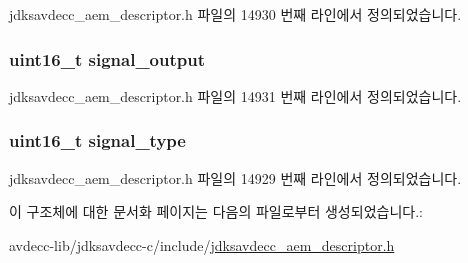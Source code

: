 jdksavdecc\+\_\+aem\+\_\+descriptor.\+h 파일의 14930 번째 라인에서 정의되었습니다.

\subsubsection[{\texorpdfstring{signal\+\_\+output}{signal_output}}]{\setlength{\rightskip}{0pt plus 5cm}uint16\+\_\+t signal\+\_\+output}\hypertarget{structjdksavdecc__descriptor__external__port_ab4b91864e6fc335d7e86536d9f4461e4}{}\label{structjdksavdecc__descriptor__external__port_ab4b91864e6fc335d7e86536d9f4461e4}


jdksavdecc\+\_\+aem\+\_\+descriptor.\+h 파일의 14931 번째 라인에서 정의되었습니다.

\subsubsection[{\texorpdfstring{signal\+\_\+type}{signal_type}}]{\setlength{\rightskip}{0pt plus 5cm}uint16\+\_\+t signal\+\_\+type}\hypertarget{structjdksavdecc__descriptor__external__port_a248e60ef99d5ed1779989d1dd6b6dc5a}{}\label{structjdksavdecc__descriptor__external__port_a248e60ef99d5ed1779989d1dd6b6dc5a}


jdksavdecc\+\_\+aem\+\_\+descriptor.\+h 파일의 14929 번째 라인에서 정의되었습니다.



이 구조체에 대한 문서화 페이지는 다음의 파일로부터 생성되었습니다.\+:\begin{DoxyCompactItemize}
\item 
avdecc-\/lib/jdksavdecc-\/c/include/\hyperlink{jdksavdecc__aem__descriptor_8h}{jdksavdecc\+\_\+aem\+\_\+descriptor.\+h}\end{DoxyCompactItemize}
